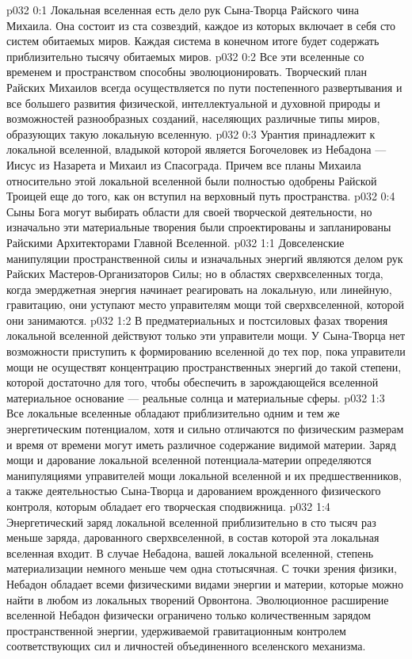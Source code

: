 \author{Могучий Вестник}
\vs p032 0:1 Локальная вселенная есть дело рук Сына\hyp{}Творца Райского чина Михаила. Она состоит из ста созвездий, каждое из которых включает в себя сто систем обитаемых миров. Каждая система в конечном итоге будет содержать приблизительно тысячу обитаемых миров.
\vs p032 0:2 Все эти вселенные со временем и пространством способны эволюционировать. Творческий план Райских Михаилов всегда осуществляется по пути постепенного развертывания и все большего развития физической, интеллектуальной и духовной природы и возможностей разнообразных созданий, населяющих различные типы миров, образующих такую локальную вселенную.
\vs p032 0:3 Урантия принадлежит к локальной вселенной, владыкой которой является Богочеловек из Небадона --- Иисус из Назарета и Михаил из Спасограда. Причем все планы Михаила относительно этой локальной вселенной были полностью одобрены Райской Троицей еще до того, как он вступил на верховный путь пространства.
\vs p032 0:4 Сыны Бога могут выбирать области для своей творческой деятельности, но изначально эти материальные творения были спроектированы и запланированы Райскими Архитекторами Главной Вселенной.
\vs p032 1:1 Довселенские манипуляции пространственной силы и изначальных энергий являются делом рук Райских Мастеров\hyp{}Организаторов Силы; но в областях сверхвселенных тогда, когда эмерджетная энергия начинает реагировать на локальную, или линейную, гравитацию, они уступают место управителям мощи той сверхвселенной, которой они занимаются.
\vs p032 1:2 В предматериальных и постсиловых фазах творения локальной вселенной действуют только эти управители мощи. У Сына\hyp{}Творца нет возможности приступить к формированию вселенной до тех пор, пока управители мощи не осуществят концентрацию пространственных энергий до такой степени, которой достаточно для того, чтобы обеспечить в зарождающейся вселенной материальное основание --- реальные солнца и материальные сферы.
\vs p032 1:3 \pc Все локальные вселенные обладают приблизительно одним и тем же энергетическим потенциалом, хотя и сильно отличаются по физическим размерам и время от времени могут иметь различное содержание видимой материи. Заряд мощи и дарование локальной вселенной потенциала\hyp{}материи определяются манипуляциями управителей мощи локальной вселенной и их предшественников, а также деятельностью Сына\hyp{}Творца и дарованием врожденного физического контроля, которым обладает его творческая сподвижница.
\vs p032 1:4 Энергетический заряд локальной вселенной приблизительно в сто тысяч раз меньше заряда, дарованного сверхвселенной, в состав которой эта локальная вселенная входит. В случае Небадона, вашей локальной вселенной, степень материализации немного меньше чем одна стотысячная. С точки зрения физики, Небадон обладает всеми физическими видами энергии и материи, которые можно найти в любом из локальных творений Орвонтона. Эволюционное расширение вселенной Небадон физически ограничено только количественным зарядом пространственной энергии, удерживаемой гравитационным контролем соответствующих сил и личностей объединенного вселенского механизма.
